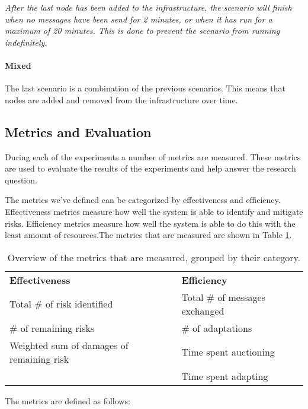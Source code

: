\textit{After the last node has been added to the infrastructure, the scenario will finish when no messages have been send for 2 minutes, or when it has run for a maximum of 20 minutes. This is done to prevent the scenario from running indefinitely.}

\paragraph*{Mixed}
The last scenario is a combination of the previous scenarios. This means that nodes are added and removed from the infrastructure over time. 

\subsection{Metrics and Evaluation}
\label{ssec:metrics}
During each of the experiments a number of metrics are measured. These metrics are used to evaluate the results of the experiments and help answer the research question. 

The metrics we've defined can be categorized by effectiveness and efficiency. Effectiveness metrics measure how well the system is able to identify and mitigate risks. Efficiency metrics measure how well the system is able to do this with the least amount of resources.The metrics that are measured are shown in Table \ref{table:metrics-groups}.

\begin{table}[H]
    \centering
    \begin{tabular}{l|l}
        \textbf{Effectiveness}            & \textbf{Efficiency}            \\
        Total \# of risk identified       & Total \# of messages exchanged \\
        \# of remaining risks             & \# of adaptations              \\
        Weighted sum of damages of remaining risk & Time spent auctioning  \\
                                          & Time spent adapting            \\
    \end{tabular}
    \caption{\label{table:metrics-groups}Overview of the metrics that are measured, grouped by their category.}
\end{table}


The metrics are defined as follows:

